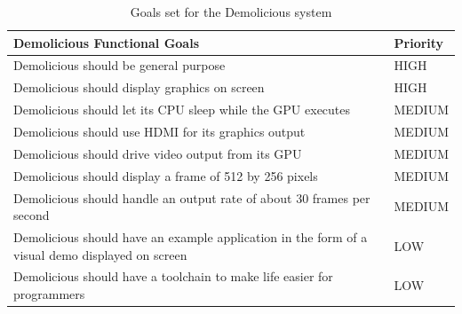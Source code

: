 \documentclass[../main/report.tex]{subfiles}
\begin{document}
\begin{table}[htp]
    \centering
    \begin{tabular}{|p{8cm}|l|}
        \hline
        \textbf{Demolicious Functional Goals}                & \textbf{Priority} \\ \hline
        Demolicious should be general purpose                                   & HIGH    \\ \hline
        Demolicious should display graphics on screen                           & HIGH    \\ \hline
        Demolicious should let its CPU sleep while the GPU executes				& MEDIUM  \\ \hline
        Demolicious should use HDMI for its graphics output	                    & MEDIUM  \\ \hline
        Demolicious should drive video output from its GPU	                    & MEDIUM  \\ \hline
        Demolicious should display a frame of 512 by 256 pixels					& MEDIUM  \\ \hline
        Demolicious should handle an output rate of about 30 frames per second  & MEDIUM  \\ \hline
        Demolicious should have an example application in the form of a visual demo displayed on screen & LOW \\ \hline
        Demolicious should have a toolchain to make life easier for programmers & LOW     \\ \hline
    \end{tabular}
    \caption{Goals set for the Demolicious system}
    \label{tab:goals}
\end{table}
\end{document}
